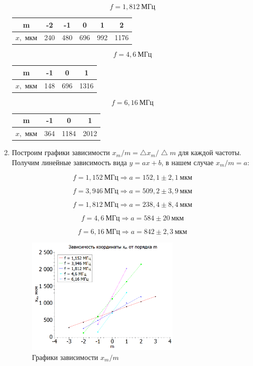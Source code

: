 \documentclass[a4paper, 12pt]{article}%
\begin{document}
\begin{enumerate}
\[f = 1,812 \: \text{МГц}\]

\begin{center}
\begin{tabular}{|c|c|c|c|c|c|}
\hline 
m & -2 & -1 & 0 & 1 & 2 \\ 
\hline 
$x,$ мкм & 240 & 480 & 696 & 992 & 1176 \\ 
\hline 
\end{tabular} 
\end{center}

\[f = 4,6 \: \text{МГц}\]

\begin{center}
\begin{tabular}{|c|c|c|c|}
\hline 
m & -1 & 0 & 1 \\ 
\hline 
$x,$ мкм & 148 & 696 & 1316 \\ 
\hline 
\end{tabular} 
\end{center}

\[f = 6,16 \: \text{МГц}\]

\begin{center}
\begin{tabular}{|c|c|c|c|}
\hline 
m & -1 & 0 & 1 \\ 
\hline 
$x,$ мкм & 364 & 1184 & 2012 \\ 
\hline 
\end{tabular} 
\end{center}

\item Построим графики зависимости $x_m / m = \bigtriangleup x_m / \bigtriangleup m$ для каждой частоты. Получим линейные зависимость вида $y = ax + b$, в нашем случае $x_m / m = a$:

\[f = 1,152 \: \text{МГц} \Rightarrow a = 152,1 \pm 2,1 \: \text{мкм}\]

\[f = 3,946 \: \text{МГц} \Rightarrow a = 509,2 \pm 3,9\: \text{мкм}\]

\[f = 1,812 \: \text{МГц} \Rightarrow a = 238,4 \pm 8,4\: \text{мкм}\]

\[f = 4,6 \: \text{МГц} \Rightarrow a = 584 \pm 20\: \text{мкм}\]

\[f = 6,16 \: \text{МГц} \Rightarrow a = 842 \pm 2,3\: \text{мкм}\]

\begin{figure}[h!]
    \centering	
    \includegraphics[width=0.7\textwidth]{images/graph_1.png}
    \caption{Графики зависимости $x_m / m$}
    \label{graph_1}
\end{figure}


\end{enumerate}
\end{document}
